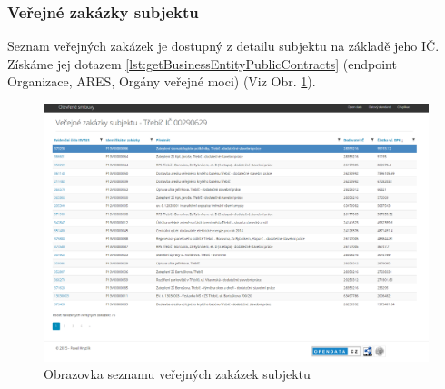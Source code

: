 












\subsubsection*{Veřejné zakázky subjektu}

Seznam veřejných zakázek je dostupný z detailu subjektu na základě jeho IČ. Získáme jej dotazem \ref{lst:getBusinessEntityPublicContracts} (endpoint Organizace, ARES, Orgány veřejné moci) (Viz Obr. \ref{obr:webPublicContracts}).\\

\begin{figure}[H]
\centerline{\includegraphics[width=\textwidth]{img/webPublicContracts.eps}}
\caption{Obrazovka seznamu veřejných zakázek subjektu}
\label{obr:webPublicContracts}
\end{figure}

